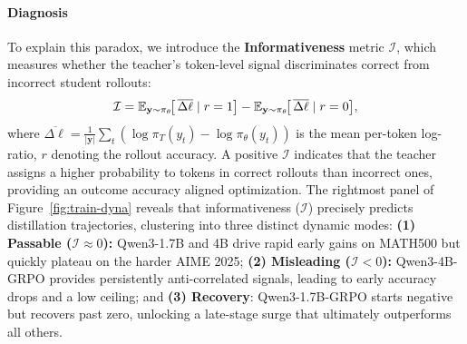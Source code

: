 \documentclass[11pt]{article}
\begin{document}
\paragraph{Diagnosis}
To explain this paradox, we introduce the \textbf{Informativeness} metric $\mathcal{I}$, which measures whether the teacher's token-level signal discriminates correct from incorrect student rollouts: 
\begin{equation}
\small
\mathcal{I} = \mathbb{E}_{\mathbf{y} \sim \pi_\theta}\!\bigl[\,\overline{\Delta \ell} \mid r = 1\bigr] - \mathbb{E}_{\mathbf{y} \sim \pi_\theta}\!\bigl[\,\overline{\Delta \ell} \mid r = 0\bigr],
\end{equation}
where $\overline{\Delta \ell} = \frac{1}{|\mathbf{y}|}\sum_t(\log \pi_T(y_t) - \log \pi_\theta(y_t))$ is the mean per-token log-ratio, $r$ denoting the rollout accuracy.
A positive $\mathcal{I}$ indicates that the teacher assigns a higher probability to tokens in correct rollouts than incorrect ones, providing an outcome accuracy aligned optimization.
The rightmost panel of Figure~\ref{fig:train-dyna} reveals that informativeness ($\mathcal{I}$) precisely predicts distillation trajectories, clustering into three distinct dynamic modes:
\textbf{(1) Passable ($\mathcal{I} \approx 0$):} Qwen3-1.7B and 4B drive rapid early gains on MATH500 but quickly plateau on the harder AIME 2025; \textbf{(2) Misleading ($\mathcal{I} < 0$):} Qwen3-4B-GRPO provides persistently anti-correlated signals, leading to early accuracy drops and a low ceiling; and \textbf{(3) Recovery}: Qwen3-1.7B-GRPO starts negative but recovers past zero, unlocking a late-stage surge that ultimately outperforms all others.

\end{document}
